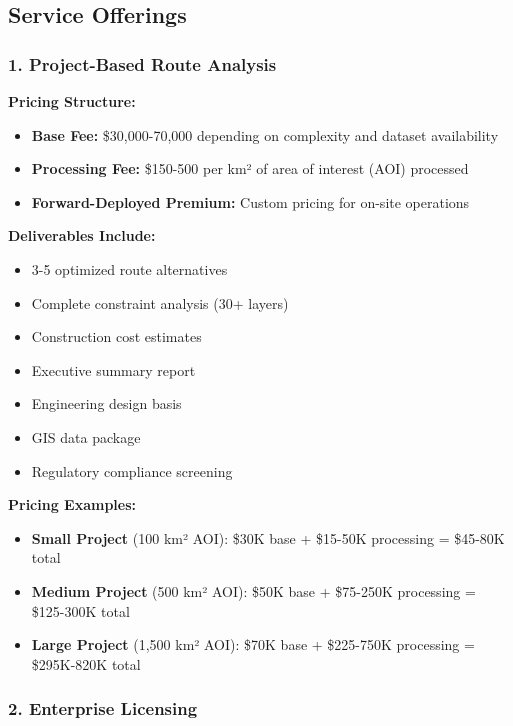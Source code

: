 \documentclass[11pt,letterpaper]{article}
\begin{document}
\subsection{Service Offerings}

\subsubsection{1. Project-Based Route Analysis}

\textbf{Pricing Structure:}
\begin{itemize}[leftmargin=*]
    \item \textbf{Base Fee:} \$30,000-70,000 depending on complexity and dataset availability
    \item \textbf{Processing Fee:} \$150-500 per km² of area of interest (AOI) processed
    \item \textbf{Forward-Deployed Premium:} Custom pricing for on-site operations
\end{itemize}

\textbf{Deliverables Include:}
\begin{itemize}[leftmargin=*]
    \item 3-5 optimized route alternatives
    \item Complete constraint analysis (30+ layers)
    \item Construction cost estimates
    \item Executive summary report
    \item Engineering design basis
    \item GIS data package
    \item Regulatory compliance screening
\end{itemize}

\textbf{Pricing Examples:}
\begin{itemize}[leftmargin=*]
    \item \textbf{Small Project} (100 km² AOI): \$30K base + \$15-50K processing = \$45-80K total
    \item \textbf{Medium Project} (500 km² AOI): \$50K base + \$75-250K processing = \$125-300K total
    \item \textbf{Large Project} (1,500 km² AOI): \$70K base + \$225-750K processing = \$295K-820K total
\end{itemize}

\subsubsection{2. Enterprise Licensing}
\end{document}
